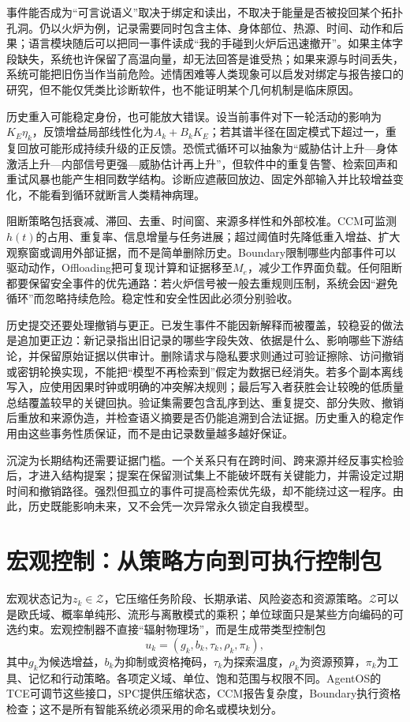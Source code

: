 事件能否成为“可言说语义”取决于绑定和读出，不取决于能量是否被投回某个拓扑孔洞。仍以火炉为例，记录需要同时包含主体、身体部位、热源、时间、动作和后果；语言模块随后可以把同一事件读成“我的手碰到火炉后迅速撤开”。如果主体字段缺失，系统也许保留了高温向量，却无法回答是谁受热；如果来源与时间丢失，系统可能把旧伤当作当前危险。述情困难等人类现象可以启发对绑定与报告接口的研究，但不能仅凭类比诊断软件，也不能证明某个几何机制是临床原因。

历史重入可能稳定身份，也可能放大错误。设当前事件对下一轮活动的影响为$K_E\eta_k$，反馈增益局部线性化为$A_k+B_kK_E$；若其谱半径在固定模式下超过一，重复回放可能形成持续升级的正反馈。恐慌式循环可以抽象为“威胁估计上升—身体激活上升—内部信号更强—威胁估计再上升”，但软件中的重复告警、检索回声和重试风暴也能产生相同数学结构。诊断应遮蔽回放边、固定外部输入并比较增益变化，不能看到循环就断言人类精神病理。

阻断策略包括衰减、滞回、去重、时间窗、来源多样性和外部校准。CCM可监测$h(t)$的占用、重复率、信息增量与任务进展；超过阈值时先降低重入增益、扩大观察窗或调用外部证据，而不是简单删除历史。Boundary限制哪些内部事件可以驱动动作，Offloading把可复现计算和证据移至$M_e$，减少工作界面负载。任何阻断都要保留安全事件的优先通路：若火炉信号被一般去重规则压制，系统会因“避免循环”而忽略持续危险。稳定性和安全性因此必须分别验收。

历史提交还要处理撤销与更正。已发生事件不能因新解释而被覆盖，较稳妥的做法是追加更正边：新记录指出旧记录的哪些字段失效、依据是什么、影响哪些下游结论，并保留原始证据以供审计。删除请求与隐私要求则通过可验证擦除、访问撤销或密钥轮换实现，不能把“模型不再检索到”假定为数据已经消失。若多个副本离线写入，应使用因果时钟或明确的冲突解决规则；最后写入者获胜会让较晚的低质量总结覆盖较早的关键回执。验证集需要包含乱序到达、重复提交、部分失败、撤销后重放和来源伪造，并检查语义摘要是否仍能追溯到合法证据。历史重入的稳定作用由这些事务性质保证，而不是由记录数量越多越好保证。

沉淀为长期结构还需要证据门槛。一个关系只有在跨时间、跨来源并经反事实检验后，才进入结构提案；提案在保留测试集上不能破坏既有关键能力，并需设定过期时间和撤销路径。强烈但孤立的事件可提高检索优先级，却不能绕过这一程序。由此，历史既能影响未来，又不会凭一次异常永久锁定自我模型。

\section{宏观控制：从策略方向到可执行控制包}
\label{sec:macroscopic_engine_eruption}

宏观状态记为$z_k\in\mathcal{Z}$，它压缩任务阶段、长期承诺、风险姿态和资源策略。$\mathcal{Z}$可以是欧氏域、概率单纯形、流形与离散模式的乘积；单位球面只是某些方向编码的可选约束。宏观控制器不直接“辐射物理场”，而是生成带类型控制包
\begin{equation}
u_k=(g_k,b_k,\tau_k,\rho_k,\pi_k),
\end{equation}
其中$g_k$为候选增益，$b_k$为抑制或资格掩码，$\tau_k$为探索温度，$\rho_k$为资源预算，$\pi_k$为工具、记忆和行动策略。各项定义域、单位、饱和范围与权限不同。AgentOS的TCE可调节这些接口，SPC提供压缩状态，CCM报告复杂度，Boundary执行资格检查；这不是所有智能系统必须采用的命名或模块划分。

